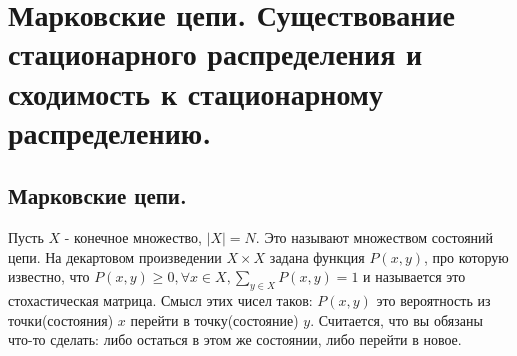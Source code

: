 \section{Марковские цепи. Существование стационарного распределения и сходимость к стационарному распределению.}

\subsection{Марковские цепи.}
Пусть $X$ - конечное множество, $|X| = N$. Это называют множеством состояний цепи. На декартовом произведении $X \times X$ задана функция $P(x,y)$, про которую известно, что $P(x,y) \geq 0, \forall x \in X, \sum\limits_{y \in X}P(x, y) = 1$ и называется это стохастическая матрица. Смысл этих чисел таков: $P(x,y)$ это вероятность из точки(состояния) $x$ перейти в точку(состояние) $y$. Считается, что вы обязаны что-то сделать: либо остаться в этом же состоянии, либо перейти в новое.

